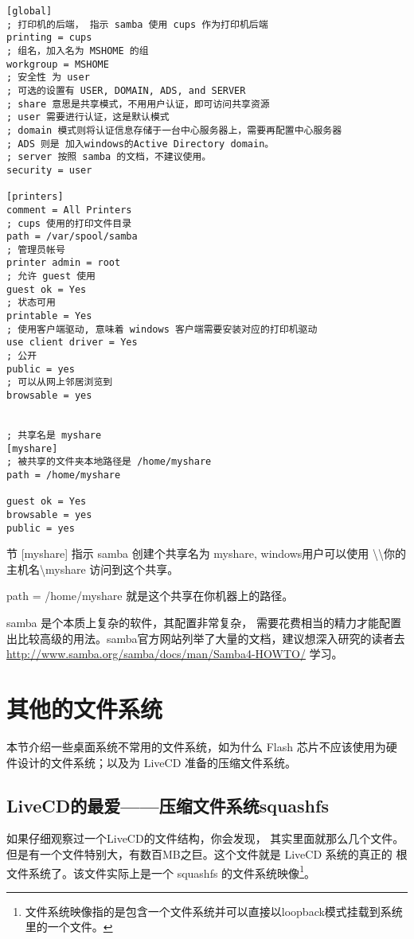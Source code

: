 \begin{verbatim}
[global]
; 打印机的后端， 指示 samba 使用 cups 作为打印机后端
printing = cups
; 组名，加入名为 MSHOME 的组
workgroup = MSHOME
; 安全性 为 user 
; 可选的设置有 USER, DOMAIN, ADS, and SERVER
; share 意思是共享模式，不用用户认证，即可访问共享资源
; user 需要进行认证，这是默认模式
; domain 模式则将认证信息存储于一台中心服务器上，需要再配置中心服务器
; ADS 则是 加入windows的Active Directory domain。
; server 按照 samba 的文档，不建议使用。
security = user

[printers]
comment = All Printers
; cups 使用的打印文件目录
path = /var/spool/samba
; 管理员帐号
printer admin = root
; 允许 guest 使用
guest ok = Yes
; 状态可用
printable = Yes
; 使用客户端驱动, 意味着 windows 客户端需要安装对应的打印机驱动
use client driver = Yes
; 公开
public = yes
; 可以从网上邻居浏览到
browsable = yes


; 共享名是 myshare
[myshare]
; 被共享的文件夹本地路径是 /home/myshare
path = /home/myshare

guest ok = Yes
browsable = yes
public = yes

\end{verbatim}

节 [myshare] 指示 samba 创建个共享名为 myshare, windows用户可以使用  \textbackslash{}\textbackslash{}你的主机名\textbackslash{}myshare 访问到这个共享。

path = /home/myshare 就是这个共享在你机器上的路径。

samba 是个本质上复杂的软件，其配置非常复杂， 需要花费相当的精力才能配置出比较高级的用法。samba官方网站列举了大量的文档，建议想深入研究的读者去
\url{http://www.samba.org/samba/docs/man/Samba4-HOWTO/} 学习。

\section{其他的文件系统}

本节介绍一些桌面系统不常用的文件系统，如为什么 Flash 芯片不应该使用为硬件设计的文件系统；以及为 LiveCD 准备的压缩文件系统。

\subsection{LiveCD的最爱——压缩文件系统squashfs}

如果仔细观察过一个LiveCD的文件结构，你会发现， 其实里面就那么几个文件。但是有一个文件特别大，有数百MB之巨。这个文件就是 LiveCD 系统的真正的 根文件系统了。该文件实际上是一个 squashfs 的文件系统映像\footnote{文件系统映像指的是包含一个文件系统并可以直接以loopback模式挂载到系统里的一个文件。}。

